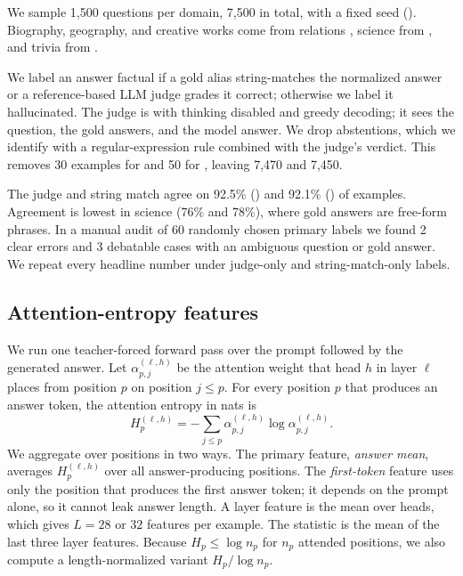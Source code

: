 We sample 1,500 questions per domain, 7,500 in total, with a fixed seed ().
Biography, geography, and creative works come from \popqa relations \citep{mallen2023popqa}, science from \sciq \citep{welbl2017sciq}, and trivia from \triviaqa \citep{joshi2017triviaqa}.



We label an answer factual if a gold alias string-matches the normalized answer or a reference-based LLM judge grades it correct; otherwise we label it hallucinated.
The judge is \judge with thinking disabled and greedy decoding; it sees the question, the gold answers, and the model answer.
We drop abstentions, which we identify with a regular-expression rule combined with the judge's verdict.
This removes 30 examples for \qwen and 50 for \llama, leaving 7,470 and 7,450.

The judge and string match agree on 92.5\% (\qwen) and 92.1\% (\llama) of examples.
Agreement is lowest in science (76\% and 78\%), where gold answers are free-form phrases.
In a manual audit of 60 randomly chosen primary labels we found 2 clear errors and 3 debatable cases with an ambiguous question or gold answer.
We repeat every headline number under judge-only and string-match-only labels.

\subsection{Attention-entropy features}

We run one teacher-forced forward pass over the prompt followed by the generated answer.
Let $\alpha^{(\ell,h)}_{p,j}$ be the attention weight that head $h$ in layer $\ell$ places from position $p$ on position $j \le p$.
For every position $p$ that produces an answer token, the attention entropy in nats is
\begin{equation}
    H^{(\ell,h)}_p = -\sum_{j \le p} \alpha^{(\ell,h)}_{p,j} \log \alpha^{(\ell,h)}_{p,j}.
    \label{eq:entropy}
\end{equation}
We aggregate over positions in two ways.
The primary feature, \emph{answer mean}, averages $H^{(\ell,h)}_p$ over all answer-producing positions.
The \emph{first-token} feature uses only the position that produces the first answer token; it depends on the prompt alone, so it cannot leak answer length.
A layer feature is the mean over heads, which gives $L=28$ or $32$ features per example.
The \Hone statistic is the mean of the last three layer features.
Because $H_p \le \log n_p$ for $n_p$ attended positions, we also compute a length-normalized variant $H_p / \log n_p$.

